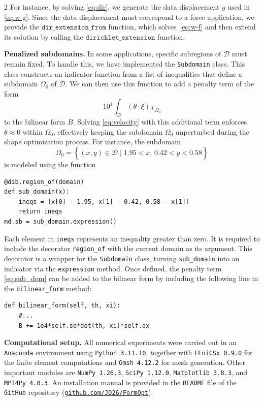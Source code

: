 \documentclass[a4paper, oneside]{article}
\newcommand{\Om}{\Omega}
\newcommand{\code}[1]{\texttt{#1}}
\begin{document}
\begin{multicols}{2}
For instance, by solving \eqref{eq:dir}, we generate the data displacement $g$ used in \eqref{eq:w-g}.
Since the data displacement must correspond to a force application,
we provide the $\code{dir\_extension\_from}$ function, which
solves~\eqref{eq:w-f} and then extend its solution by calling
the $\code{dirichlet\_extension}$ function.

\vspace*{0.5cm}
\noindent \textbf{Penalized subdomains.}
In some applications, specific subregions of $\overline{\mathcal{D}}$ must remain fixed. 
To handle this, we have implemented the \code{Subdomain} class.
This class constructs an indicator function from a list of inequalities that
define a subdomain $\Om_0$ of $\overline{\mathcal{D}}$. We can then use this function
to add a penalty term of the form
\begin{equation}\label{eq:sub_dom}
	{10}^4 \int_{\mathcal{D}} (\theta \cdot \xi) \chi_{\Omega_0}
\end{equation}
to the bilinear form $B$.
Solving \eqref{eq:velocity} with this additional term enforces $\theta \approx 0$ within $\Omega_0$, effectively keeping the subdomain $\Omega_0$ unperturbed during the shape optimization process.
For instance, the subdomain
\begin{equation}
	\Omega_0 = \left\{ (x,y)\in \overline{\mathcal{D}} \mid 1.95 < x,\, 0.42 < y < 0.58   \right\}
\end{equation}
is modeled using the function
\begin{lstlisting}
@dib.region_of(domain)
def sub_domain(x):
    ineqs = [x[0] - 1.95, x[1] - 0.42, 0.58 - x[1]]
    return ineqs
md.sb = sub_domain.expression()
\end{lstlisting}
Each element in \code{ineqs} represents an inequality greater than zero.
It is required to include the decorator \code{region\_of} with the
current domain as its argument. This decorator is a wrapper for the \code{Subdomain} class,
turning \code{sub\_domain} into an indicator via the \code{expression} method.
Once defined, the penalty term \eqref{eq:sub_dom}
can be added to the bilinear form by including the
following line in the \code{bilinear\_form} method:
\begin{lstlisting}
def bilinear_form(self, th, xi):
	#...
	B += 1e4*self.sb*dot(th, xi)*self.dx
\end{lstlisting}

\vspace*{0.5cm}
\noindent \textbf{Computational setup.}
All numerical experiments were carried out in an \code{Anaconda} environment using \code{Python~3.11.10},
together with \code{FEniCSx~0.9.0} for the finite element computations and
\code{Gmsh~4.12.2} for mesh generation. Other important modules are
\code{NumPy~1.26.3}, \code{SciPy~1.12.0}, \code{Matplotlib~3.8.3}, and \code{MPI4Py~4.0.3}.
An installation manual is provided in the \code{README} file of the \code{GitHub} repository
(\href{https://github.com/JD26/FormOpt}{\texttt{github.com/JD26/FormOpt}}).



\end{multicols}
\end{document}
